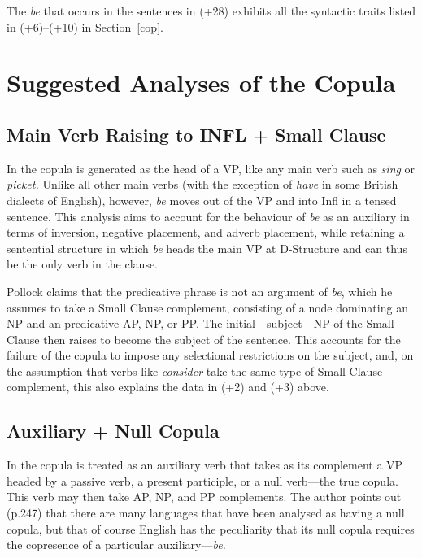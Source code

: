 The {\em be} that occurs in the sentences in (+28) exhibits all the
syntactic traits listed in (+6)--(+10) in Section~\ref{cop}.


\section{Suggested Analyses of the Copula}

\subsection{Main Verb Raising to INFL + Small Clause}

In \cite{po89} the copula is generated as the head of a VP, like any
main verb such as {\em sing} or {\em picket.\/} Unlike all other main
verbs (with the exception of {\em have} in some British dialects of
English), however, {\em be} moves out of the VP and into Infl in a
tensed sentence.  This analysis aims to account for the behaviour of
{\em be} as an auxiliary in terms of inversion, negative placement, and
adverb placement, while retaining a sentential structure in which {\em
be} heads the main VP at D-Structure and can thus be the only verb in
the clause.

Pollock claims that the predicative phrase is not an argument of {\em
be}, which he assumes to take a Small Clause complement, consisting of a
node dominating an NP and an predicative AP, NP, or PP. The
initial---subject---NP of the Small Clause then raises to become the
subject of the sentence.  This accounts for the failure of the copula to
impose any selectional restrictions on the subject, and, on the
assumption that verbs like {\em consider} take the same type of Small
Clause complement, this also explains the data in (+2) and (+3) above.

\subsection{Auxiliary + Null Copula}

\label{la}
In \cite{la80} the copula is treated as an auxiliary verb that takes as
its complement a VP headed by a passive verb, a present participle, or a
null verb---the true copula. This verb may then take AP, NP, and PP
complements.  The author points out (p.247) that there are many
languages that have been analysed as having a null copula, but that of
course English has the peculiarity that its null copula requires the
copresence of a particular auxiliary---{\em be.\/}

